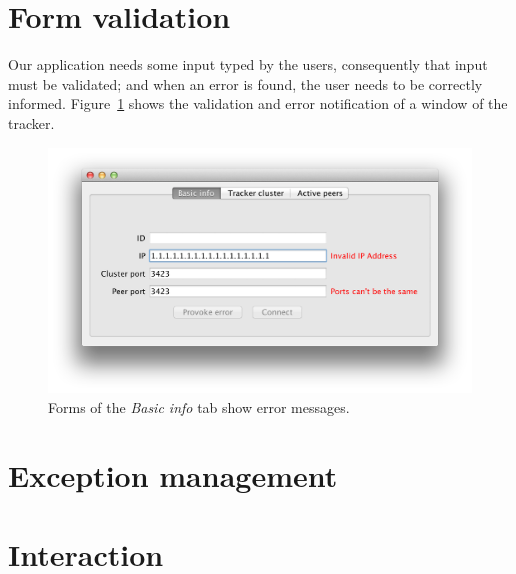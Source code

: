 \documentclass[twoside,a4paper,10pt]{article}
\begin{document}
\section{Form validation}

Our application needs some input typed by the users, consequently that input
must be validated; and when an error is found, the user needs to be correctly
informed. Figure~\ref{fig:validation}
shows the validation and error notification of a window of the tracker.

\begin{figure}[h]
  \centering
  \includegraphics[width=\textwidth]{imgs/form_validation.png}
  \caption{\label{fig:validation}Forms of the \emph{Basic info} tab show
    error messages.}
\end{figure}


\section{Exception management}

\section{Interaction}

%
%
\end{document}
